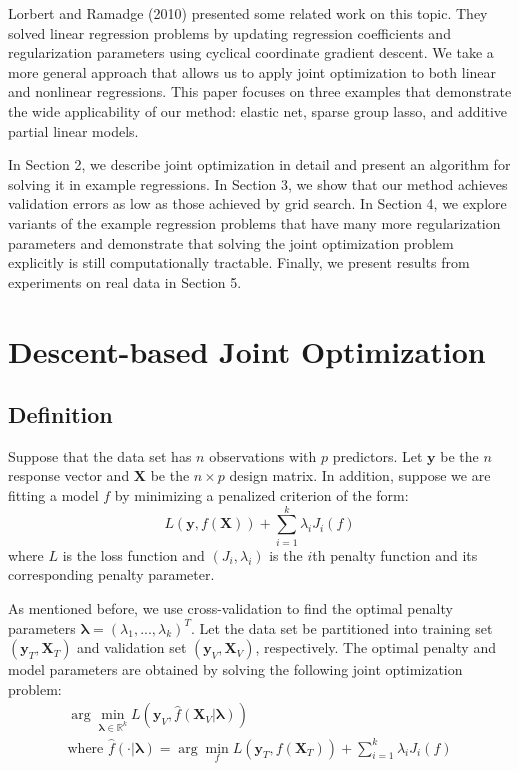 \documentclass[10pt,letterpaper]{article}
\begin{document}
Lorbert and Ramadge (2010) presented some related work on this topic. They solved linear regression problems by updating regression coefficients and regularization parameters using cyclical coordinate gradient descent. We take a more general approach that allows us to apply joint optimization to both linear and nonlinear regressions. This paper focuses on three examples that demonstrate the wide applicability of our method: elastic net, sparse group lasso, and additive partial linear models.

In Section 2, we describe joint optimization in detail and present an algorithm for solving it in example regressions. In Section 3, we show that our method achieves validation errors as low as those achieved by grid search. In Section 4, we explore variants of the example regression problems that have many more regularization parameters and demonstrate that solving the joint optimization problem explicitly is still computationally tractable. Finally, we present results from experiments on real data in Section 5.

\section{Descent-based Joint Optimization}
\subsection{Definition}
Suppose that the data set has $n$ observations with $p$ predictors. Let $\boldsymbol{y}$ be the $n$ response vector and $\boldsymbol{X}$ be the $n \times p$ design matrix. In addition, suppose we are fitting a model $f$ by minimizing a penalized criterion of the form:
\begin{equation}
L(\boldsymbol{y}, f (\boldsymbol{X})) + \sum\limits_{i=1}^k \lambda_i J_i(f)
\end{equation}
where $L$ is the loss function and $(J_i, \lambda_i)$ is the $i$th penalty function and its corresponding penalty parameter.

As mentioned before, we use cross-validation to find the optimal penalty parameters $\boldsymbol{\lambda} = (\lambda_1, ..., \lambda_k)^T$. Let the data set be partitioned into training set $(\boldsymbol{y}_T , \boldsymbol{X}_T)$ and validation set $(\boldsymbol{y}_V, \boldsymbol{X}_V)$, respectively. The optimal penalty and model parameters are obtained by solving the following joint optimization problem:
\begin{equation}
\begin{array}{c}
\arg \min_{\boldsymbol{\lambda} \in \mathbb{R}^k} L(\boldsymbol{y}_V, \hat f(\boldsymbol{X}_V | \boldsymbol{\lambda})) \\
\text{where } \hat f(\cdot | \boldsymbol{\lambda}) = \arg \min_f L(\boldsymbol{y}_T, f (\boldsymbol{X}_T)) + \sum\limits_{i=1}^k \lambda_i J_i(f)
\end{array}
\label{jointopt2}
\end{equation}
\end{document}
